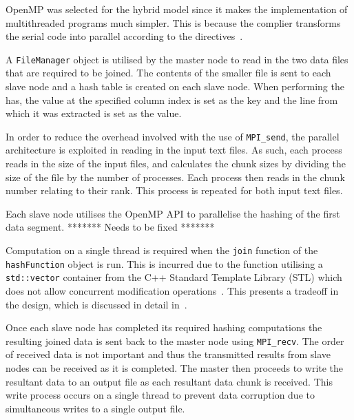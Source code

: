 \documentclass[11pt,twocolumn]{witseiepaper}
\begin{document}
OpenMP was selected for the hybrid model since it makes the implementation of multithreaded programs much simpler. This is because the complier transforms the serial code into parallel according to the directives~\cite{comparingMPIMapReduce}.

A \texttt{FileManager} object is utilised by the master node to read in the two data files that are required to be joined. The contents of the smaller file is sent to each slave node and a hash table is created on each slave node. When performing the has, the value at the specified column index is set as the key and the line from which it was extracted is set as the value.


In order to reduce the overhead involved with the use of \texttt{MPI\_send}, the parallel architecture is exploited in reading in the input text files. As such, each process reads in the size of the input files, and calculates the chunk sizes by dividing the size of the file by the number of processes. Each process then reads in the chunk number relating to their rank. This process is repeated for both input text files.

Each slave node utilises the OpenMP API to parallelise the hashing of the first data segment. ******* Needs to be fixed *******


Computation on a single thread is required when the \texttt{join} function of the \texttt{hashFunction} object is run. This is incurred due to the function utilising a \texttt{std::vector} container from the C++ Standard Template Library (STL) which does not allow concurrent modification operations~\cite{stl-vector}. This presents a tradeoff in the design, which is discussed in detail in~.

Once each slave node has completed its required hashing computations the resulting joined data is sent back to the master node using \texttt{MPI\_recv}. The order of received data is not important and thus the transmitted results from slave nodes can be received as it is completed. The master then proceeds to write the resultant data to an output file as each resultant data chunk is received. This write process occurs on a single thread to prevent data corruption due to simultaneous writes to a single output file.
\end{document}
